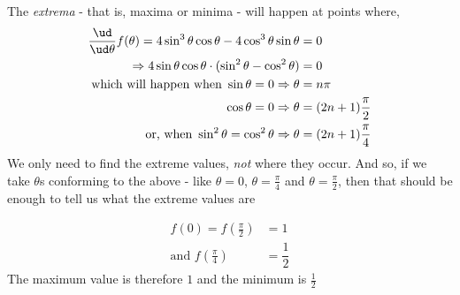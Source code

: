 \begin{solution}
  The \textit{extrema} - that is, maxima or minima - will happen at points where,
  \begin{align}
     \dfrac{\ud}{\ud\theta}f(\theta) = 4\sin^3\theta\cos\theta - 4\cos^3\theta\sin\theta &= 0\\
        \Rightarrow 4\sin\theta\cos\theta\cdot(\sin^2\theta - \cos^2\theta) &= 0 \\
        \text{which will happen when } \sin\theta = 0 \Rightarrow \theta &= n\pi \\
              \cos\theta = 0 \Rightarrow \theta &= (2n+1)\frac{\pi}{2} \\
        \text{or, when } \sin^2\theta = \cos^2\theta \Rightarrow \theta &= (2n+1)\frac{\pi}{4}
  \end{align}
  We only need to find the extreme values, \textit{not} where they occur. And so, if we take $\theta$s
  conforming to the above - like $\theta = 0$, $\theta = \frac{\pi}{4}$ and $\theta = \frac{\pi}{2}$, then
  that should be enough to tell us what the extreme values are
  
  \begin{align}
     f(0) = f(\frac{\pi}{2}) &= 1 \\
     \text{and } f(\frac{\pi}{4}) &= \dfrac{1}{2}
  \end{align}
  The maximum value is therefore $1$ and the minimum is $\frac{1}{2}$
\end{solution}
